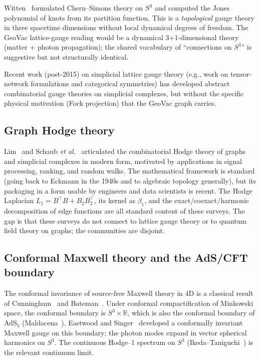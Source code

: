 \documentclass[aps,pra,twocolumn,superscriptaddress,longbibliography]{revtex4-2}
\begin{document}
Witten~\cite{Witten1989} formulated Chern--Simons theory on $S^3$ and
computed the Jones polynomial of knots from its partition function.
This is a \emph{topological} gauge theory in three spacetime
dimensions without local dynamical degrees of freedom.  The GeoVac
lattice-gauge reading would be a dynamical 3+1-dimensional theory
(matter + photon propagation); the shared vocabulary of
``connections on $S^3$'' is suggestive but not structurally identical.

Recent work (post-2015) on simplicial lattice gauge theory
(e.g., work on tensor-network formulations and categorical
symmetries) has developed abstract combinatorial gauge theories on
simplicial complexes, but without the specific physical motivation
(Fock projection) that the GeoVac graph carries.

\subsection{Graph Hodge theory}

Lim~\cite{Lim2020} and Schaub \emph{et al.}~\cite{Schaub2020}
articulated the combinatorial Hodge theory of graphs and simplicial
complexes in modern form, motivated by applications in signal
processing, ranking, and random walks.  The mathematical framework is
standard (going back to Eckmann in the 1940s and to algebraic
topology generally), but its packaging in a form usable by
engineers and data scientists is recent.  The Hodge Laplacian
$L_1 = B^{\top} B + B_2 B_2^{\top}$, its kernel as $\beta_1$, and
the exact/coexact/harmonic decomposition of edge functions are all
standard content of these surveys.  The gap is that these surveys do
not connect to lattice gauge theory or to quantum field theory on
graphs; the communities are disjoint.

\subsection{Conformal Maxwell theory and the AdS/CFT boundary}

The conformal invariance of source-free Maxwell theory in 4D is a
classical result of Cunningham~\cite{Cunningham1909} and
Bateman~\cite{Bateman1910}.  Under conformal compactification of
Minkowski space, the conformal boundary is $S^3 \times \mathbb{R}$,
which is also the conformal boundary of AdS$_5$
(Maldacena~\cite{Maldacena1998}).  Eastwood and
Singer~\cite{EastwoodSinger1985} developed a conformally invariant
Maxwell gauge on this boundary; the photon modes expand in vector
spherical harmonics on $S^3$.  The continuous Hodge--1 spectrum on
$S^3$ (Ikeda--Taniguchi~\cite{IkedaTaniguchi1978}) is the relevant
continuum limit.
\end{document}
